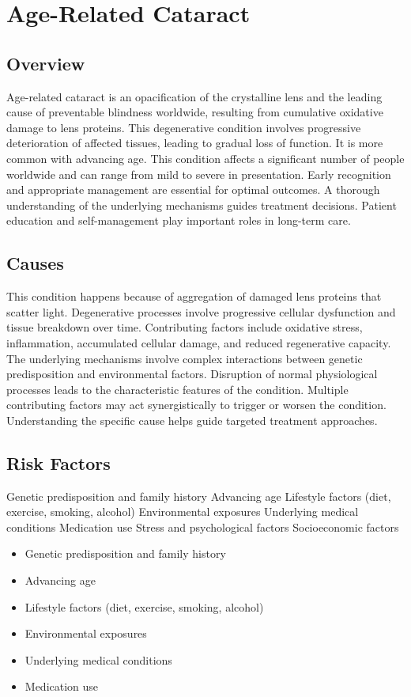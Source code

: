 \chapter{Age-Related Cataract}
\label{sec:Age-Related Cataract}

\section{Overview}
Age-related cataract is an opacification of the crystalline lens and the leading cause of preventable blindness worldwide, resulting from cumulative oxidative damage to lens proteins. This degenerative condition involves progressive deterioration of affected tissues, leading to gradual loss of function. It is more common with advancing age. This condition affects a significant number of people worldwide and can range from mild to severe in presentation. Early recognition and appropriate management are essential for optimal outcomes. A thorough understanding of the underlying mechanisms guides treatment decisions. Patient education and self-management play important roles in long-term care.
\section{Causes}
This condition happens because of aggregation of damaged lens proteins that scatter light. Degenerative processes involve progressive cellular dysfunction and tissue breakdown over time. Contributing factors include oxidative stress, inflammation, accumulated cellular damage, and reduced regenerative capacity. The underlying mechanisms involve complex interactions between genetic predisposition and environmental factors. Disruption of normal physiological processes leads to the characteristic features of the condition. Multiple contributing factors may act synergistically to trigger or worsen the condition. Understanding the specific cause helps guide targeted treatment approaches.
\section{Risk Factors}
Genetic predisposition and family history Advancing age Lifestyle factors (diet, exercise, smoking, alcohol) Environmental exposures Underlying medical conditions Medication use Stress and psychological factors Socioeconomic factors

\begin{itemize}[noitemsep]
  \item Genetic predisposition and family history
  \item Advancing age
  \item Lifestyle factors (diet, exercise, smoking, alcohol)
  \item Environmental exposures
  \item Underlying medical conditions
  \item Medication use
\end{itemize}
